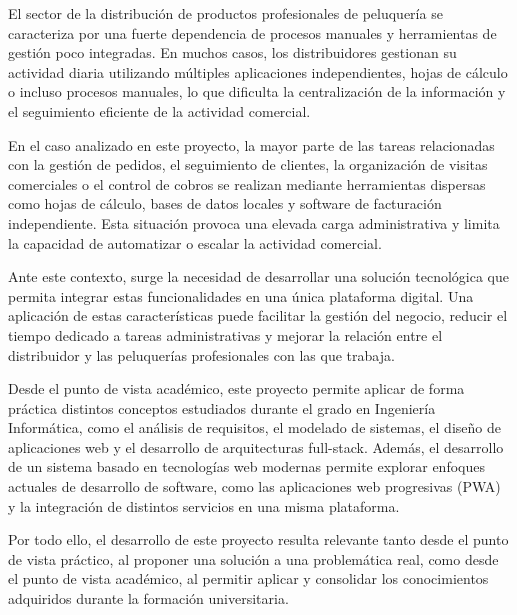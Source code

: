 El sector de la distribución de productos profesionales de peluquería se caracteriza por una fuerte dependencia de procesos manuales y herramientas de gestión poco integradas. En muchos casos, los distribuidores gestionan su actividad diaria utilizando múltiples aplicaciones independientes, hojas de cálculo o incluso procesos manuales, lo que dificulta la centralización de la información y el seguimiento eficiente de la actividad comercial.

En el caso analizado en este proyecto, la mayor parte de las tareas relacionadas con la gestión de pedidos, el seguimiento de clientes, la organización de visitas comerciales o el control de cobros se realizan mediante herramientas dispersas como hojas de cálculo, bases de datos locales y software de facturación independiente. Esta situación provoca una elevada carga administrativa y limita la capacidad de automatizar o escalar la actividad comercial.

Ante este contexto, surge la necesidad de desarrollar una solución tecnológica que permita integrar estas funcionalidades en una única plataforma digital. Una aplicación de estas características puede facilitar la gestión del negocio, reducir el tiempo dedicado a tareas administrativas y mejorar la relación entre el distribuidor y las peluquerías profesionales con las que trabaja.

Desde el punto de vista académico, este proyecto permite aplicar de forma práctica distintos conceptos estudiados durante el grado en Ingeniería Informática, como el análisis de requisitos, el modelado de sistemas, el diseño de aplicaciones web y el desarrollo de arquitecturas full-stack. Además, el desarrollo de un sistema basado en tecnologías web modernas permite explorar enfoques actuales de desarrollo de software, como las aplicaciones web progresivas (PWA) y la integración de distintos servicios en una misma plataforma.

Por todo ello, el desarrollo de este proyecto resulta relevante tanto desde el punto de vista práctico, al proponer una solución a una problemática real, como desde el punto de vista académico, al permitir aplicar y consolidar los conocimientos adquiridos durante la formación universitaria.